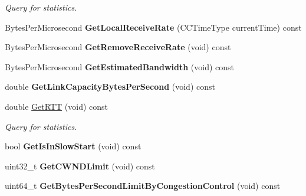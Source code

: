 \begin{DoxyCompactItemize}
\begin{DoxyCompactList}\small\item\em Query for statistics. \end{DoxyCompactList}\item 
\hypertarget{class_rak_net_1_1_c_c_rak_net_sliding_window_a934eab66102b9fe6ffe9a93c6b87cb9f}{Bytes\-Per\-Microsecond {\bfseries Get\-Local\-Receive\-Rate} (C\-C\-Time\-Type current\-Time) const }\label{class_rak_net_1_1_c_c_rak_net_sliding_window_a934eab66102b9fe6ffe9a93c6b87cb9f}

\item 
\hypertarget{class_rak_net_1_1_c_c_rak_net_sliding_window_a768a00f862721c2a323f8a8f87f0b4e3}{Bytes\-Per\-Microsecond {\bfseries Get\-Remove\-Receive\-Rate} (void) const }\label{class_rak_net_1_1_c_c_rak_net_sliding_window_a768a00f862721c2a323f8a8f87f0b4e3}

\item 
\hypertarget{class_rak_net_1_1_c_c_rak_net_sliding_window_a95b5cf606b8b62ece86dbd7245b3010b}{Bytes\-Per\-Microsecond {\bfseries Get\-Estimated\-Bandwidth} (void) const }\label{class_rak_net_1_1_c_c_rak_net_sliding_window_a95b5cf606b8b62ece86dbd7245b3010b}

\item 
\hypertarget{class_rak_net_1_1_c_c_rak_net_sliding_window_aa5f7c2b108a98025d9a4ab823b9cc954}{double {\bfseries Get\-Link\-Capacity\-Bytes\-Per\-Second} (void) const }\label{class_rak_net_1_1_c_c_rak_net_sliding_window_aa5f7c2b108a98025d9a4ab823b9cc954}

\item 
\hypertarget{class_rak_net_1_1_c_c_rak_net_sliding_window_a844eb712f90029e5e1b3069a11e912ff}{double \hyperlink{class_rak_net_1_1_c_c_rak_net_sliding_window_a844eb712f90029e5e1b3069a11e912ff}{Get\-R\-T\-T} (void) const }\label{class_rak_net_1_1_c_c_rak_net_sliding_window_a844eb712f90029e5e1b3069a11e912ff}

\begin{DoxyCompactList}\small\item\em Query for statistics. \end{DoxyCompactList}\item 
\hypertarget{class_rak_net_1_1_c_c_rak_net_sliding_window_a1cf6c1e2341ad4ba0ce5cf9f39cb353b}{bool {\bfseries Get\-Is\-In\-Slow\-Start} (void) const }\label{class_rak_net_1_1_c_c_rak_net_sliding_window_a1cf6c1e2341ad4ba0ce5cf9f39cb353b}

\item 
\hypertarget{class_rak_net_1_1_c_c_rak_net_sliding_window_a3fd082a2752e6f179fe4d7a110445023}{uint32\-\_\-t {\bfseries Get\-C\-W\-N\-D\-Limit} (void) const }\label{class_rak_net_1_1_c_c_rak_net_sliding_window_a3fd082a2752e6f179fe4d7a110445023}

\item 
\hypertarget{class_rak_net_1_1_c_c_rak_net_sliding_window_a6745c18b918567aef1db9fb8fbd25a78}{uint64\-\_\-t {\bfseries Get\-Bytes\-Per\-Second\-Limit\-By\-Congestion\-Control} (void) const }\label{class_rak_net_1_1_c_c_rak_net_sliding_window_a6745c18b918567aef1db9fb8fbd25a78}

\end{DoxyCompactItemize}
